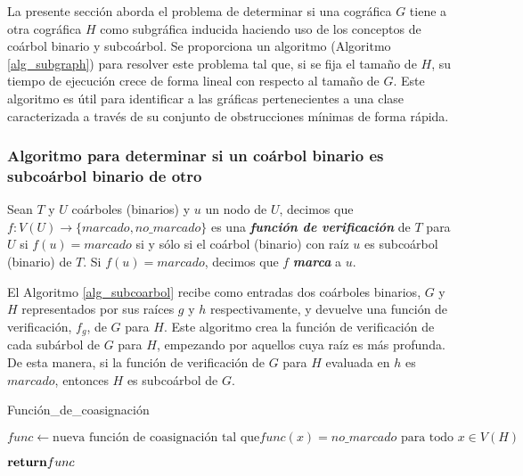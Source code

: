 La presente sección aborda el problema de determinar si una cográfica $G$ tiene
a otra cográfica $H$ como subgráfica inducida haciendo uso de los conceptos de
coárbol binario y subcoárbol. Se proporciona un algoritmo (Algoritmo
\ref{alg_subgraph}) para resolver este problema tal que, si se fija el tamaño de
$H$, su tiempo de ejecución crece de forma lineal con respecto al tamaño de $G$.
Este algoritmo es útil para identificar a las gráficas pertenecientes a una clase
caracterizada a través de su conjunto de obstrucciones mínimas de forma rápida.

\subsubsection{Algoritmo para determinar si un coárbol binario es subcoárbol binario de otro}

Sean $T$ y $U$ coárboles (binarios) y $u$ un nodo de $U$, decimos que
$f \colon V(U)\rightarrow\{marcado, no\_marcado\}$ es una
\textbf{\emph{función de verificación}} de $T$ para $U$ si $f(u) = marcado$
si y sólo si el coárbol (binario) con raíz $u$ es subcoárbol (binario) de
$T$. Si $f(u) = marcado$, decimos que $f$ \textbf{\emph{marca}} a $u$.

El Algoritmo \ref{alg_subcoarbol} recibe como entradas dos coárboles binarios,
$G$ y $H$ representados por sus raíces $g$ y $h$ respectivamente, y devuelve
una función de verificación, $f_g$, de $G$ para $H$. Este algoritmo crea la
función de verificación de cada subárbol de $G$ para $H$, empezando por
aquellos cuya raíz es más profunda. De esta manera, si la función de
verificación de $G$ para $H$ evaluada en $h$ es $marcado$, entonces $H$ es
subcoárbol de $G$.

\begin{algorithm}[ht!]
\caption{Función\_de\_coasignación}
\label{alg_subcoarbol}
\DontPrintSemicolon %

 $func \gets \text{nueva función de coasignación tal que} func(x)=no\_marcado \text{ para todo } x\in V(H)$\;


$\Return func$

\end{algorithm}

